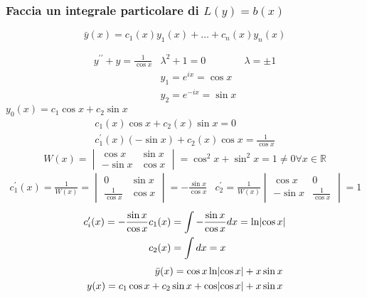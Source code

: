 \subsubsection{Faccia un integrale particolare di $L(y)=b(x)$}
\begin{equation*}
	\bar{y}(x)=c_1(x)y_1(x)+\dots+c_n(x)y_n(x)
\end{equation*}
\begin{esempio}
	\begin{eqnarray*}
		y^{\prime\prime}+y=\frac{1}{\cos x} & \lambda^2+1=0 & \lambda =\pm 1\\
		& y_1=e^{ix}=\cos x\\
		& y_2=e^{-ix}=\sin x
	\end{eqnarray*}
	$y_0(x)=c_1\cos x +c_2 \sin x$
	\begin{eqnarray*}
		c_1 (x)\cos x +c_2(x) \sin x =0\\
		c_1^\prime (x)(-\sin x)+c_2(x)\cos x= \frac{1}{\cos x}
	\end{eqnarray*}
	\begin{equation*}
		W(x)=\begin{vmatrix}
			\cos x & \sin x\\
			-\sin x & \cos x
		\end{vmatrix} =\cos^2x+\sin^2x=1\neq 0 \forall x \in \mathds{R}
	\end{equation*}
	\begin{eqnarray*}
		c_1^\prime(x)=\frac{1}{W(x)}=\begin{vmatrix}
			0 &\sin x\\
			\frac{1}{\cos x} &\cos x
		\end{vmatrix}= -\frac{\sin x}{\cos x} &
		c_2^\prime=\frac{1}{W(x)}\begin{vmatrix}
			\cos x & 0\\
			-\sin x & \frac{1}{\cos x}
		\end{vmatrix} =1
	\end{eqnarray*}
	\begin{eqnarray*}
		c^\prime_i(x)=-\frac{\sin x}{\cos x} & c_1(x)=\int
		-\frac{\sin x}{\cos x} dx=\ln\lvert\cos x\rvert\\
		&c_2(x)=\int dx=x
	\end{eqnarray*}
	\begin{eqnarray*}
		\bar{y}(x)=\cos x \ln\lvert\cos x\rvert+x \sin x\\
		y(x)=c_1\cos x +c_2 \sin x +\cos \lvert\cos x\rvert+x\sin x
	\end{eqnarray*}
\end{esempio}

